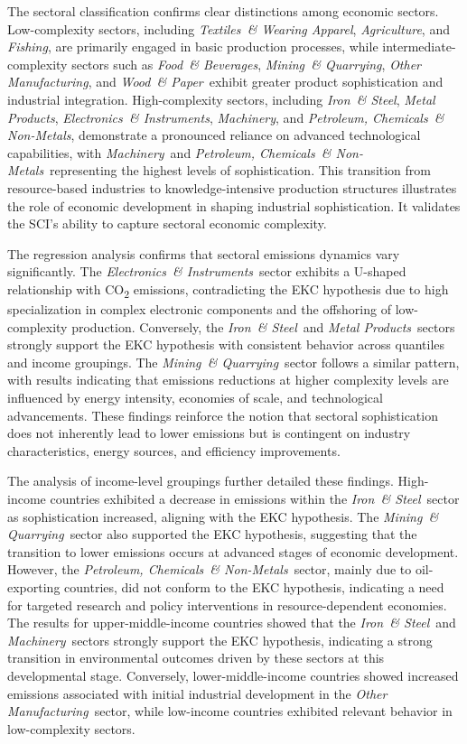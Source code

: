 \documentclass[10pt]{article}
\newcommand{\AG}{\textit{Agriculture}}
\newcommand{\EL}{\textit{Electronics~\& Instruments}}
\newcommand{\FI}{\textit{Fishing}}
\newcommand{\FO}{\textit{Food~\& Beverages}}
\newcommand{\IR}{\textit{Iron~\& Steel}}
\newcommand{\MA}{\textit{Machinery}}
\newcommand{\ME}{\textit{Metal Products}}
\newcommand{\MI}{\textit{Mining~\& Quarrying}}
\newcommand{\OT}{\textit{Other Manufacturing}}
\newcommand{\PE}{\textit{Petroleum, Chemicals~\& Non-Metals}}
\newcommand{\TE}{\textit{Textiles~\& Wearing Apparel}}
\newcommand{\WO}{\textit{Wood~\& Paper}}
\begin{document}
The sectoral classification confirms clear distinctions among economic sectors. Low-complexity sectors, including \TE, \AG, and \FI, are primarily engaged in basic production processes, while intermediate-complexity sectors such as \FO, \MI, \OT, and \WO\ exhibit greater product sophistication and industrial integration. High-complexity sectors, including \IR, \ME, \EL, \MA, and \PE, demonstrate a pronounced reliance on advanced technological capabilities, with \MA\ and \PE\ representing the highest levels of sophistication. This transition from resource-based industries to knowledge-intensive production structures illustrates the role of economic development in shaping industrial sophistication. It validates the SCI's ability to capture sectoral economic complexity.

The regression analysis confirms that sectoral emissions dynamics vary significantly. The \EL\ sector exhibits a U-shaped relationship with CO\textsubscript{2} emissions, contradicting the EKC hypothesis due to high specialization in complex electronic components and the offshoring of low-complexity production. Conversely, the \IR\ and \ME\ sectors strongly support the EKC hypothesis with consistent behavior across quantiles and income groupings. The \MI\ sector follows a similar pattern, with results indicating that emissions reductions at higher complexity levels are influenced by energy intensity, economies of scale, and technological advancements. These findings reinforce the notion that sectoral sophistication does not inherently lead to lower emissions but is contingent on industry characteristics, energy sources, and efficiency improvements.

The analysis of income-level groupings further detailed these findings. High-income countries exhibited a decrease in emissions within the \IR\ sector as sophistication increased, aligning with the EKC hypothesis. The \MI\ sector also supported the EKC hypothesis, suggesting that the transition to lower emissions occurs at advanced stages of economic development. However, the \PE\ sector, mainly due to oil-exporting countries, did not conform to the EKC hypothesis, indicating a need for targeted research and policy interventions in resource-dependent economies. The results for upper-middle-income countries showed that the \IR\ and \MA\ sectors strongly support the EKC hypothesis, indicating a strong transition in environmental outcomes driven by these sectors at this developmental stage. Conversely, lower-middle-income countries showed increased emissions associated with initial industrial development in the \OT\ sector, while low-income countries exhibited relevant behavior in low-complexity sectors.
\end{document}
